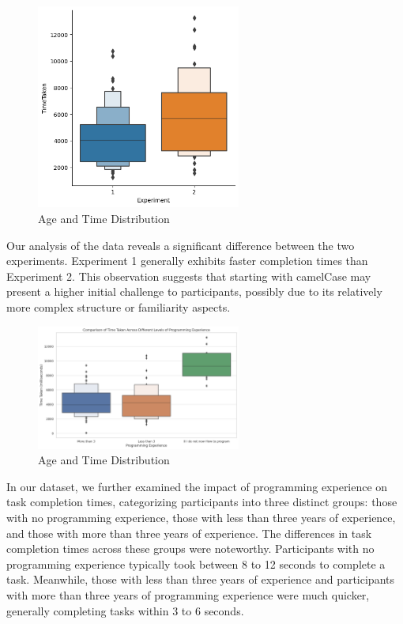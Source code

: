 \documentclass{article}
\begin{document}
\begin{figure}[H]
    \centering
    \includegraphics[width=0.6\textwidth]{difference_experiment.png}
    \caption{Age and Time Distribution}
\end{figure}

Our analysis of the data reveals a significant difference between the two experiments. Experiment 1 generally exhibits faster completion times than Experiment 2. This observation suggests that starting with camelCase may present a higher initial challenge to participants, possibly due to its relatively more complex structure or familiarity aspects.

\begin{figure}[H]
    \centering
    \includegraphics[width=0.6\textwidth]{programming_experience.png}
    \caption{Age and Time Distribution}
\end{figure}

In our dataset, we further examined the impact of programming experience on task completion times, categorizing participants into three distinct groups: those with no programming experience, those with less than three years of experience, and those with more than three years of experience. The differences in task completion times across these groups were noteworthy. Participants with no programming experience typically took between 8 to 12 seconds to complete a task. Meanwhile, those with less than three years of experience and participants with more than three years of programming experience were much quicker, generally completing tasks within 3 to 6 seconds.
\end{document}
